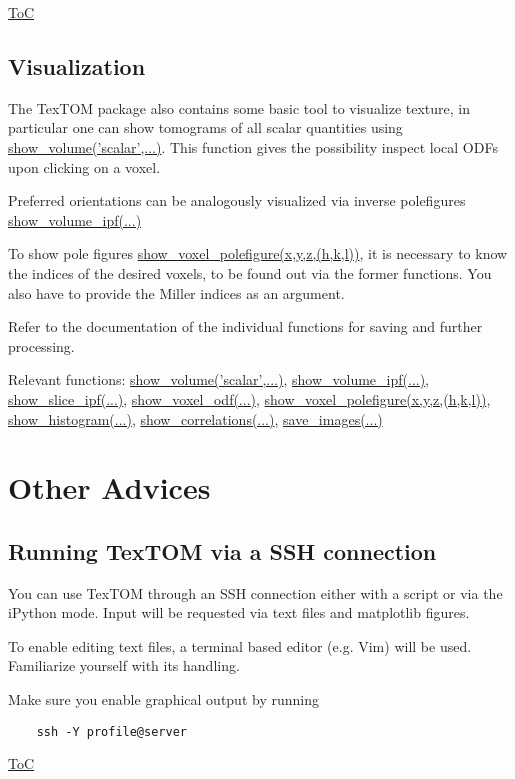 \begin{flushright}
    \hyperref[toc]{ToC}
\end{flushright}

\subsection{Visualization}
The TexTOM package also contains some basic tool to visualize texture, in particular
one can show tomograms of all scalar quantities using \hyperref[fun:showvolume]{show\_volume('scalar',...)}.
This function gives the possibility inspect local ODFs upon clicking on a voxel.

Preferred orientations can be analogously visualized via inverse polefigures \hyperref[fun:showvolume]{show\_volume\_ipf(...)}

To show pole figures \hyperref[fun:showvoxelpolefigure]{show\_voxel\_polefigure(x,y,z,(h,k,l))}, it is necessary to know 
the indices of the desired voxels, to be found out via the former functions. You also have to provide the
Miller indices as an argument.

Refer to the documentation of the individual functions for saving and further processing.

Relevant functions:
\hyperref[fun:showvolume]{show\_volume('scalar',...)},
\hyperref[fun:showvolumeipf]{show\_volume\_ipf(...)},
\hyperref[fun:showsliceipf]{show\_slice\_ipf(...)},
\hyperref[fun:showvoxelodf]{show\_voxel\_odf(...)},
\hyperref[fun:showvoxelpolefigure]{show\_voxel\_polefigure(x,y,z,(h,k,l))},
\hyperref[fun:showhistogram]{show\_histogram(...)},
\hyperref[fun:showcorrelations]{show\_correlations(...)},
\hyperref[fun:saveimages]{save\_images(...)}

\section{Other Advices}
\subsection{Running TexTOM via a SSH connection}
You can use TexTOM through an SSH connection either with a script or via the iPython mode.
Input will be requested via text files and matplotlib figures.

To enable editing text files, a terminal based editor (e.g. Vim) will be used.
Familiarize yourself with its handling.

Make sure you enable graphical output by running 
\begin{verbatim}
    ssh -Y profile@server
\end{verbatim}

\begin{flushright}
    \hyperref[toc]{ToC}
\end{flushright}
